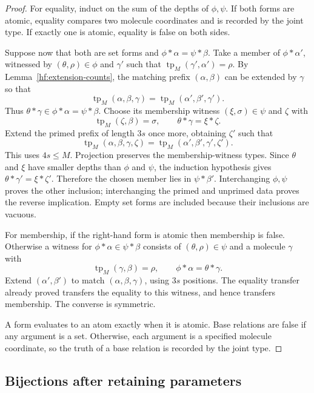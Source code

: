 \begin{proof}
For equality, induct on the sum of the depths of $\phi,\psi$.
If both forms are atomic, equality compares two molecule coordinates
and is recorded by the joint type.  If exactly one is atomic,
equality is false on both sides.

Suppose now that both are set forms and
$\phi*\alpha=\psi*\beta$.
Take a member of $\phi*\alpha'$, witnessed by
$(\theta,\rho)\in\phi$ and $\gamma'$ such that
$\operatorname{tp}_M(\gamma',\alpha')=\rho$.
By Lemma~\ref{hf:extension-counts}, the matching prefix $(\alpha,\beta)$
can be extended by $\gamma$ so that
\[
 \operatorname{tp}_M(\alpha,\beta,\gamma)
    =\operatorname{tp}_M(\alpha',\beta',\gamma').
\]
Thus $\theta*\gamma\in\phi*\alpha=\psi*\beta$.
Choose its membership witness $(\xi,\sigma)\in\psi$ and $\zeta$ with
\[
 \operatorname{tp}_M(\zeta,\beta)=\sigma,
 \qquad
 \theta*\gamma=\xi*\zeta .
\]
Extend the primed prefix of length $3s$ once more, obtaining $\zeta'$
such that
\[
 \operatorname{tp}_M(\alpha,\beta,\gamma,\zeta)
    =\operatorname{tp}_M(\alpha',\beta',\gamma',\zeta').
\]
This uses $4s\leq M$.
Projection preserves the membership-witness types.
Since $\theta$ and $\xi$ have smaller depths than $\phi$ and $\psi$,
the induction hypothesis gives
$\theta*\gamma'=\xi*\zeta'$.
Therefore the chosen member lies in $\psi*\beta'$.
Interchanging $\phi,\psi$ proves the other inclusion; interchanging
the primed and unprimed data proves the reverse implication.
Empty set forms are included because their inclusions are vacuous.

For membership, if the right-hand form is atomic then membership is
false.  Otherwise a witness for $\phi*\alpha\in\psi*\beta$ consists of
$(\theta,\rho)\in\psi$ and a molecule $\gamma$ with
\[
 \operatorname{tp}_M(\gamma,\beta)=\rho,\qquad
 \phi*\alpha=\theta*\gamma .
\]
Extend $(\alpha',\beta')$ to match
$(\alpha,\beta,\gamma)$, using $3s$ positions.
The equality transfer already proved transfers the equality to this
witness, and hence transfers membership.  The converse is symmetric.

A form evaluates to an atom exactly when it is atomic.
Base relations are false if any argument is a set.
Otherwise, each argument is a specified molecule coordinate, so the
truth of a base relation is recorded by the joint type.
\end{proof}

\subsection{Bijections after retaining parameters}

